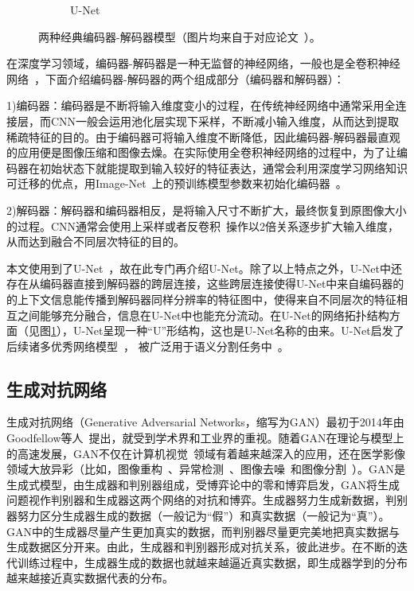 \begin{figure}[h!]
\begin{subfigure}{0.71\textwidth}
		\caption{U-Net~\cite{ronneberger2015u}}
		\label{subfig:popular_encoder_decoder_unet}
	\end{subfigure}
	\caption[两种经典编码器-解码器模型]{两种经典编码器-解码器模型（图片均来自于对应论文~\cite{hinton2006reducing, ronneberger2015u}）。} 
	\label{mulfig:popular_encoder_decoder}
\end{figure}

在深度学习领域，编码器-解码器是一种无监督的神经网络，一般也是全卷积神经网络~\cite{long2015fully}，下面介绍编码器-解码器的两个组成部分（编码器和解码器）：

1)编码器：编码器是不断将输入维度变小的过程，在传统神经网络中通常采用全连接层，而CNN一般会运用池化层实现下采样，不断减小输入维度，从而达到提取稀疏特征的目的。由于编码器可将输入维度不断降低，因此编码器-解码器最直观的应用便是图像压缩和图像去燥。在实际使用全卷积神经网络的过程中，为了让编码器在初始状态下就能提取到输入较好的特征表达，通常会利用深度学习网络知识可迁移的优点，用Image-Net~\cite{deng2009imagenet}上的预训练模型参数来初始化编码器~\cite{iglovikov2018ternausnet}。

2)解码器：解码器和编码器相反，是将输入尺寸不断扩大，最终恢复到原图像大小的过程。CNN通常会使用上采样或者反卷积~\cite{zeiler2010deconvolutional}操作以2倍关系逐步扩大输入维度，从而达到融合不同层次特征的目的。

本文使用到了U-Net~\cite{ronneberger2015u}，故在此专门再介绍U-Net。除了以上特点之外，U-Net中还存在从编码器直接到解码器的跨层连接，这些跨层连接使得U-Net中来自编码器的的上下文信息能传播到解码器同样分辨率的特征图中，使得来自不同层次的特征相互之间能够充分融合，信息在U-Net中也能充分流动。在U-Net的网络拓扑结构方面（见图\ref{subfig:popular_encoder_decoder_unet}），U-Net呈现一种“U”形结构，这也是U-Net名称的由来。U-Net启发了后续诸多优秀网络模型~\cite{zhou2018unet++, oktay2018attention, alom2019recurrent}，
被广泛用于语义分割任务中~\cite{cciccek20163d,dong2017automatic,li2018h}。
\subsection{生成对抗网络}\label{subsec:gan_introduction}
生成对抗网络（Generative Adversarial Networks，缩写为GAN）最初于2014年由Goodfellow等人~\cite{goodfellow2014generative}提出，就受到学术界和工业界的重视。随着GAN在理论与模型上的高速发展，GAN不仅在计算机视觉~\cite{zhu2017unpaired}领域有着越来越深入的应用，还在医学影像领域大放异彩（比如，图像重构~\cite{bhadra2020medical}、异常检测~\cite{Kohl2017AdversarialNF}、图像去噪~\cite{Yang2018LowDoseCI}和图像分割~\cite{Han2018SpineGANSS}）。GAN是生成式模型，由生成器和判别器组成，受博弈论中的零和博弈启发，GAN将生成问题视作判别器和生成器这两个网络的对抗和博弈。生成器努力生成新数据，判别器努力区分生成器生成的数据（一般记为“假”）和真实数据（一般记为“真”）。GAN中的生成器尽量产生更加真实的数据，而判别器尽量更完美地把真实数据与生成数据区分开来。由此，生成器和判别器形成对抗关系，彼此进步。在不断的迭代训练过程中，生成器生成的数据也就越来越逼近真实数据，即生成器学到的分布越来越接近真实数据代表的分布。

